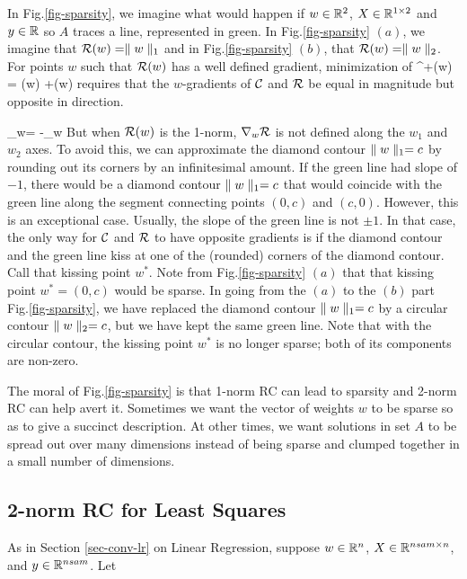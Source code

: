 In Fig.\ref{fig-sparsity}, we imagine
what would happen if
$w\in { \mathbb{R}}^2$, $X\in { \mathbb{R}}^{1\times 2}$
and $y\in { \mathbb{R}}$ so $A$ traces a line,
represented in green.
In Fig.\ref{fig-sparsity} $(a)$,
we imagine that ${\cal R}(w)=\parallel w\parallel_1$
and in Fig.\ref{fig-sparsity} $(b)$, that
${\cal R}(w)=\parallel w\parallel_2$.
For points $w$ such that ${\cal R}(w)$
has a well defined gradient, 
minimization of 
\beq
\calc^+(w) = \calc(w) +\calr(w)
\eeq
requires that the $w$-gradients of
${\cal C}$ and ${\cal R}$ be equal in magnitude but opposite in direction.

\beq
\nabla_w\calc = -\nabla_w \calr
\eeq
But when ${\cal R}(w)$ is
the 1-norm,  $\nabla_w{\cal R}$ is not defined along the $w_1$
and $w_2$ axes. To avoid this, we can 
approximate the diamond contour $\parallel w\parallel_1=c$
by rounding out its corners
by an infinitesimal amount. If the green line had 
slope of $-1$,
there would be a diamond contour
 $\parallel w\parallel_1=c$ that would coincide with the green line along the 
 segment connecting points $(0,c)$
 and $(c,0)$. However, this is an exceptional case. Usually, the slope
 of the green line is not $\pm 1$.
 In that case, the only way for 
 ${\cal C}$ and ${\cal R}$ to have
 opposite gradients is if the diamond 
 contour and the green line 
 kiss at one of the (rounded)  corners
 of the diamond contour. Call that
 kissing point $w^*$. Note from
 Fig.\ref{fig-sparsity} $(a)$ that that kissing point $w^*=(0,c)$ would be
 sparse. In going from the $(a)$ to the $(b)$ part Fig.\ref{fig-sparsity},
 we have replaced the diamond contour
 $\parallel w\parallel_1=c$ by
 a circular contour $\parallel w\parallel_2=c$,
 but we have kept the same green line.
 Note that with the circular contour,
 the kissing point $w^*$ is no longer sparse; both of its components are non-zero.
 
 The moral of Fig.\ref{fig-sparsity}
 is that 1-norm RC can lead to sparsity and 2-norm RC can help avert it.
 Sometimes we want the vector of weights $w$ to be sparse so as to give
 a succinct description.
 At other times, we want solutions in set $A$ to be spread out over many dimensions instead of being sparse and clumped together in a small number of dimensions.






\subsection{2-norm RC for Least Squares}
As in Section \ref{sec-conv-lr} on Linear Regression, 
suppose $w\in{ \mathbb{R}}^n$, $X\in { \mathbb{R}}^{nsam\times n}$,
 and  $y\in{ \mathbb{R}}^{nsam} $. Let

